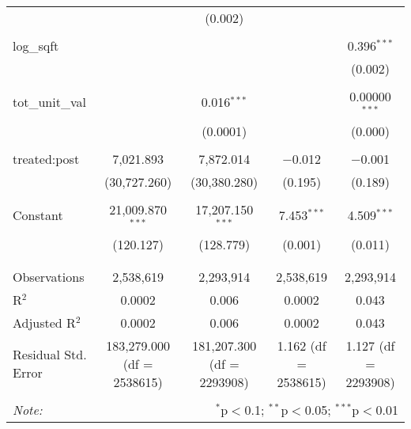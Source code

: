 \begin{table}[H]
{\begin{tabular}{@{\extracolsep{5pt}}lcccc}
   &  & (0.002) &  &  \\  

   & & & & \\  

  log\_sqft &  &  &  & 0.396$^{***}$ \\  

   &  &  &  & (0.002) \\  

   & & & & \\  

  tot\_unit\_val &  & 0.016$^{***}$ &  & 0.00000$^{***}$ \\  

   &  & (0.0001) &  & (0.000) \\  

   & & & & \\  

  treated:post & 7,021.893 & 7,872.014 & $-$0.012 & $-$0.001 \\  

   & (30,727.260) & (30,380.280) & (0.195) & (0.189) \\  

   & & & & \\  

  Constant & 21,009.870$^{***}$ & 17,207.150$^{***}$ & 7.453$^{***}$ & 4.509$^{***}$ \\  

   & (120.127) & (128.779) & (0.001) & (0.011) \\  

   & & & & \\  

 \hline \\[-1.8ex]  

 Observations & 2,538,619 & 2,293,914 & 2,538,619 & 2,293,914 \\  

 R$^{2}$ & 0.0002 & 0.006 & 0.0002 & 0.043 \\  

 Adjusted R$^{2}$ & 0.0002 & 0.006 & 0.0002 & 0.043 \\  

 Residual Std. Error & 183,279.000 (df = 2538615) & 181,207.300 (df = 2293908) & 1.162 (df = 2538615) & 1.127 (df = 2293908) \\  

 \hline  

 \hline \\[-1.8ex]  

 \textit{Note:}  & \multicolumn{4}{r}{$^{*}$p$<$0.1; $^{**}$p$<$0.05; $^{***}$p$<$0.01} \\  

 \end{tabular}}  

 \end{table}  

